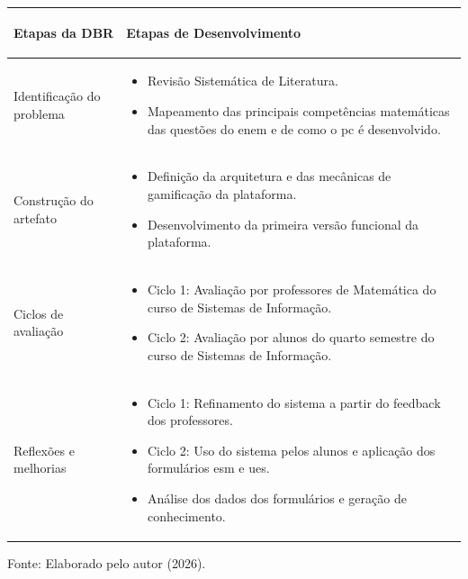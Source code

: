 \begin{quadro}[H]
    \centering
    \caption{Etapas da \texorpdfstring{\gls{dbr}}{DBR} e seus respectivos desenvolvimentos}
    \label{qua:dbr}
    \renewcommand{\arraystretch}{1.2}
    \begin{tabular}{ | >{\bfseries\raggedright\arraybackslash}p{4.0cm} |
        >{\raggedright\arraybackslash}p{10.5cm} | }
        \hline
        \normalfont\bfseries Etapas da DBR & \normalfont\bfseries Etapas de
        Desenvolvimento \\
        \hline

        Identificação do problema &
        \begin{itemize}[leftmargin=*, topsep=2pt, itemsep=2pt]
            \item Revisão Sistemática de Literatura.
            \item Mapeamento das principais competências matemáticas das questões do \gls{enem} e de como o \gls{pc} é desenvolvido.
        \end{itemize} \\
        \hline

        Construção do artefato &
        \begin{itemize}[leftmargin=*, topsep=2pt, itemsep=2pt]
            \item Definição da arquitetura e das mecânicas de gamificação da plataforma.
            \item Desenvolvimento da primeira versão funcional da plataforma.
        \end{itemize} \\
        \hline

        Ciclos de avaliação &
        \begin{itemize}[leftmargin=*, topsep=2pt, itemsep=2pt]
            \item Ciclo 1: Avaliação por professores de Matemática do curso de Sistemas de Informação.
            \item Ciclo 2: Avaliação por alunos do quarto semestre do curso de Sistemas de Informação.
        \end{itemize} \\
        \hline

        Reflexões e melhorias &
        \begin{itemize}[leftmargin=*, topsep=2pt, itemsep=2pt]
            \item Ciclo 1: Refinamento do sistema a partir do feedback dos professores.
            \item Ciclo 2: Uso do sistema pelos alunos e aplicação dos formulários \gls{esm} e \gls{ues}.
            \item Análise dos dados dos formulários e geração de conhecimento.
        \end{itemize} \\
        \hline
    \end{tabular}

    \vspace{0.2cm}
    {\small Fonte: Elaborado pelo autor (2026).}
\end{quadro}
